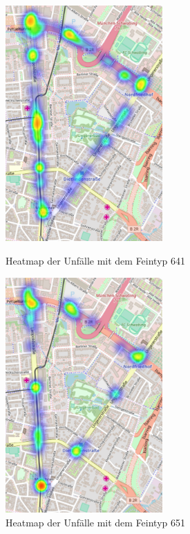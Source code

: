 \begin{figure}[htb]
	\centering
	\begin{minipage}[t]{0.45\linewidth}
		\centering
		\includegraphics[width=6cm,height=9cm]{figures/HM_641}
		\caption{Heatmap der Unfälle mit dem Feintyp 641}\label{fig:Heatmap_641}
	\end{minipage}%
	\hfill
	\begin{minipage}[t]{0.45\linewidth}
		\centering
		\includegraphics[width=6cm,height=9cm]{figures/HM_651}
		\caption{Heatmap der Unfälle mit dem Feintyp 651}\label{fig:Heatmap_651}
	\end{minipage}
\end{figure}

